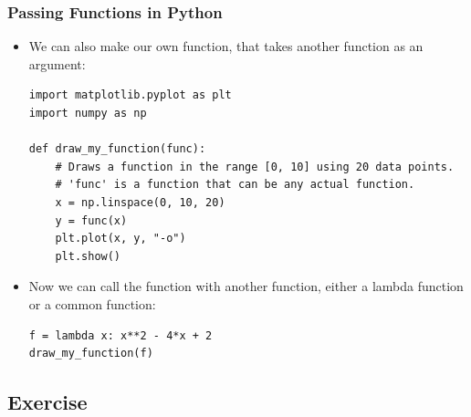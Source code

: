 \begin{frame}[fragile]
  \frametitle{Passing Functions in Python}

  \begin{itemize}
    \item We can also make our own function, that takes another function as an argument:
          \begin{lstlisting}
import matplotlib.pyplot as plt
import numpy as np

def draw_my_function(func):
    # Draws a function in the range [0, 10] using 20 data points.
    # 'func' is a function that can be any actual function.
    x = np.linspace(0, 10, 20)
    y = func(x)
    plt.plot(x, y, "-o")
    plt.show()
      \end{lstlisting}

    \item Now we can call the function with another function, either a lambda function or a common function:
          \begin{lstlisting}
f = lambda x: x**2 - 4*x + 2
draw_my_function(f)
      \end{lstlisting}
  \end{itemize}
\end{frame}

\subsection*{Exercise}

